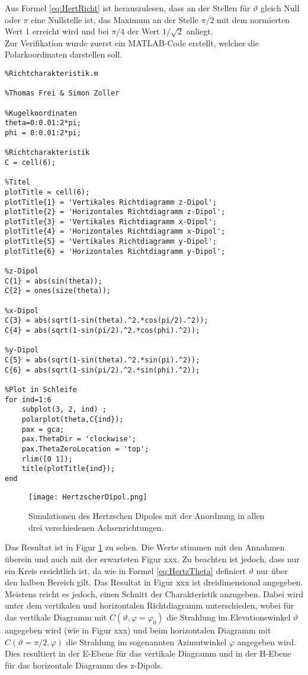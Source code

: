 Aus Formel \ref{eq:HertRicht} ist herauszulesen, dass an der Stellen für $\vartheta$ gleich Null oder $\pi$ eine Nullstelle ist, das Maximum an der Stelle $\pi/2$ mit dem normierten Wert 1 erreicht wird und bei $\pi/4$ der Wert $1/\sqrt{2}$ anliegt.\\

Zur Verifikation wurde zuerst ein MATLAB-Code erstellt, welcher die Polarkoordinaten darstellen soll.

\begin{lstlisting}
%Richtcharakteristik.m

%Thomas Frei & Simon Zoller

%Kugelkoordinaten
theta=0:0.01:2*pi;
phi = 0:0.01:2*pi;

%Richtcharakteristik
C = cell(6);

%Titel
plotTitle = cell(6);
plotTitle{1} = 'Vertikales Richtdiagramm z-Dipol';
plotTitle{2} = 'Horizontales Richtdiagramm z-Dipol';
plotTitle{3} = 'Vertikales Richtdiagramm x-Dipol';
plotTitle{4} = 'Horizontales Richtdiagramm x-Dipol';
plotTitle{5} = 'Vertikales Richtdiagramm y-Dipol';
plotTitle{6} = 'Horizontales Richtdiagramm y-Dipol';

%z-Dipol
C{1} = abs(sin(theta));
C{2} = ones(size(theta));

%x-Dipol
C{3} = abs(sqrt(1-sin(theta).^2.*cos(pi/2).^2));
C{4} = abs(sqrt(1-sin(pi/2).^2.*cos(phi).^2));

%y-Dipol
C{5} = abs(sqrt(1-sin(theta).^2.*sin(pi).^2));
C{6} = abs(sqrt(1-sin(pi/2).^2.*sin(phi).^2));

%Plot in Schleife
for ind=1:6
    subplot(3, 2, ind) ;
    polarplot(theta,C{ind});
    pax = gca;
    pax.ThetaDir = 'clockwise';
    pax.ThetaZeroLocation = 'top';
    rlim([0 1]);
    title(plotTitle{ind});
end
\end{lstlisting}

\begin{figure}[!ht]
	\centering
    \texttt{[image: HertzscherDipol.png]}
    \caption{Simulationen des Hertzschen Dipoles mit der Anordnung in allen drei verschiedenen Achsenrichtungen.}
    \label{fig:HertzscherDipol}
\end{figure}

Das Resultat ist in Figur \ref{fig:HertzscherDipol} zu sehen. Die Werte stimmen mit den Annahmen überein und auch mit der erwarteten Figur xxx. Zu beachten ist jedoch, dass nur ein Kreis ersichtlich ist, da wie in Formel \ref{eq:HertzTheta} definiert $\vartheta$ nur über den halben Bereich gilt. Das Resultat in Figur xxx ist dreidimensional angegeben. Meistens reicht es jedoch, einen Schnitt der Charakteristik anzugeben. Dabei wird unter dem vertikalen und horizontalen Richtdiagramm unterschieden, wobei für das vertikale Diagramm mit $C(\vartheta, \varphi = \varphi_0)$ die Strahlung im Elevationswinkel $\vartheta$ angegeben wird (wie in Figur xxx) und beim horizontalen Diagramm mit $C(\vartheta=\pi/2, \varphi)$ die Strahlung im sogenannten Azimutwinkel $\varphi$ angegeben wird. Dies resultiert in der E-Ebene für das vertikale Diagramm und in der H-Ebene für das horizontale Diagramm des z-Dipols.\\

